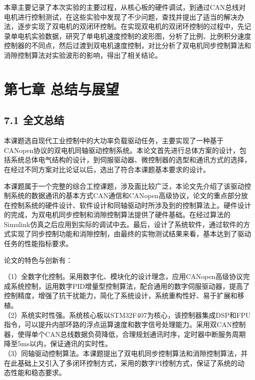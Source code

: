 \documentclass[UTF8,zihao=-4,openany,oneside]{ctexbook}
\begin{document}
本章主要记录了本次实验的主要过程，从核心板的硬件调试，到通过CAN总线对电机进行控制测试，在这些实验中发现了不少问题，查找并提出了适当的解决办法，逐步实现了双电机的双闭环控制。在实现双电机的双闭环控制的过程中，先记录单电机实验数据，研究了单电机速度控制的波形图，分析了比例、比例积分速度控制器的不同点，然后过渡到双电机速度控制，对比分析了双电机同步控制算法和消隙控制算法对实验波形的影响，得出了相关结论。

\chapter{第七章 总结与展望}

\section{7.1 全文总结}

本课题选自现代工业控制中的大功率负载驱动任务，主要实现了一种基于CANopen协议的双电机同轴驱动控制系统。本论文首先进行总体方案的设计，包括系统总体电气结构的设计，到伺服驱动器、微控制器的选型和通讯方式的选择，在经过不同方案对比论证以后，选出了符合本课题基本要求的设计。

本课题属于一个完整的综合工控课题，涉及面比较广泛，本论文先介绍了该驱动控制系统的数据通讯的基本方式CAN通信和CANopen高级协议，论文的重点部分放在控制系统的硬件设计、软件设计和同轴驱动时所涉及到的控制算法上。硬件设计的完成，为双电机同步控制和消隙控制算法提供了硬件基础。在经过算法的Simulink仿真之后应用到实际的调试中去。最后，设计了系统软件，通过软件的方式实现了同步控制功能和消隙控制，由最终的实物测试结果来看，基本达到了驱动任务的性能指标要求。

论文的特色与创新有：

\noindent （1）全数字化控制。采用数字化、模块化的设计理念，应用CANopen高级协议完成系统控制，运用数字PID增量型控制算法，配合通用的数字伺服驱动器，提高了控制精度，增强了抗干扰能力，简化了系统设计，系统重构性好、易于扩展和移植。\\

\noindent （2）系统实时性强。系统核心板以STM32F407为核心，该控制器集成DSP和FPU指令，可以提升内部环路的浮点运算速度和数字信号处理能力。采用双CAN控制器，使得单个CAN总线数据负荷降低，合理规划通讯时序，定时器中断服务周期降至5ms以内，保证通讯的实时性。\\

\noindent （3）同轴驱动控制算法。本课题提出了双电机同步控制算法和消隙控制算法，并在此基础上又引入了多闭环控制方式，采用的数字PI控制方式，保证了系统的动态性能和稳态要求。\\
\end{document}
